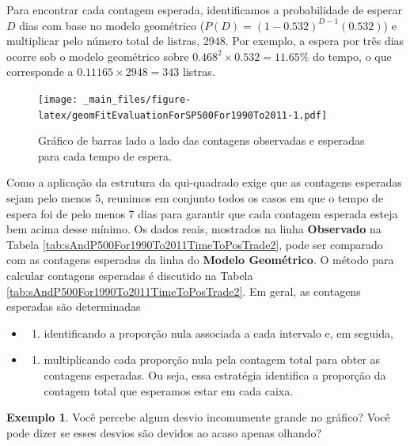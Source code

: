 \documentclass[
]{book}
\providecommand{\tightlist}{%
  \setlength{\itemsep}{0pt}\setlength{\parskip}{0pt}}
\theoremstyle{definition}
\theoremstyle{definition}
\newtheorem{example}{Exemplo}[chapter]
\theoremstyle{definition}
\theoremstyle{definition}
\theoremstyle{remark}
\begin{document}
Para encontrar cada contagem esperada, identificamos a probabilidade de esperar \(D\) dias com base no modelo geométrico (\(P(D) = (1-0.532)^{D-1}(0.532)\)) e multiplicar pelo número total de listras, 2948. Por exemplo, a espera por três dias ocorre sob o modelo geométrico sobre \(0.468^2\times 0.532 = 11.65\%\) do tempo, o que corresponde a \(0.11165\times2948 = 343\) listras.

\begin{figure}
\centering
\texttt{[image: \_main\_files/figure-latex/geomFitEvaluationForSP500For1990To2011-1.pdf]}
\caption{\label{fig:geomFitEvaluationForSP500For1990To2011}Gráfico de barras lado a lado das contagens observadas e esperadas para cada tempo de espera.}
\end{figure}

Como a aplicação da estrutura da qui-quadrado exige que as contagens esperadas sejam pelo menos 5, reunimos em conjunto todos os casos em que o tempo de espera foi de pelo menos 7 dias para garantir que cada contagem esperada esteja bem acima desse mínimo. Os dados reais, mostrados na linha \textbf{Observado} na Tabela \ref{tab:sAndP500For1990To2011TimeToPosTrade2}, pode ser comparado com as contagens esperadas da linha do \textbf{Modelo Geométrico}. O método para calcular contagens esperadas é discutido na Tabela \ref{tab:sAndP500For1990To2011TimeToPosTrade2}. Em geral, as contagens esperadas são determinadas

\begin{itemize}
\item
  \begin{enumerate}
  \def\labelenumi{(\arabic{enumi})}
  \tightlist
  \item
    identificando a proporção nula associada a cada intervalo e, em seguida,
  \end{enumerate}
\item
  \begin{enumerate}
  \def\labelenumi{(\arabic{enumi})}
  \setcounter{enumi}{1}
  \tightlist
  \item
    multiplicando cada proporção nula pela contagem total para obter as contagens esperadas. Ou seja, essa estratégia identifica a proporção da contagem total que esperamos estar em cada caixa.
  \end{enumerate}
\end{itemize}

\begin{example}
\protect\hypertarget{exm:unnamed-chunk-247}{}{\label{exm:unnamed-chunk-247} }Você percebe algum desvio incomumente grande no gráfico? Você pode dizer se esses desvios são devidos ao acaso apenas olhando?
\end{example}
\end{document}
